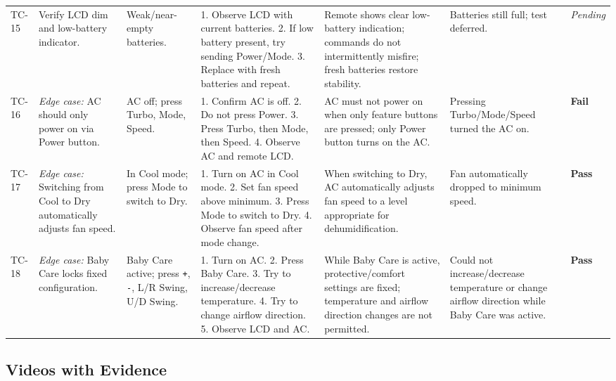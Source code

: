 \documentclass[12pt, a4paper]{article}
\newcommand{\vpass}{\textcolor{PassGreen}{\textbf{Pass}}}
\newcommand{\vfail}{\textcolor{FailRed}{\textbf{Fail}}}
\newcommand{\vpending}{\textcolor{PendingGray}{\textit{Pending}}}
\begin{document}
{\begin{longtable}{@{} C{1cm} L{2.5cm} L{1.8cm} L{3cm} L{2.8cm} L{1.8cm} C{1cm} @{}}
TC-15 & Verify LCD dim and low-battery indicator. & Weak/near-empty batteries. & 1. Observe LCD with current batteries. 2. If low battery present, try sending Power/Mode. 3. Replace with fresh batteries and repeat. & Remote shows clear low-battery indication; commands do not intermittently misfire; fresh batteries restore stability. & Batteries still full; test deferred. & \vpending \\
TC-16 & \textit{Edge case:} AC should only power on via Power button. & AC off; press Turbo, Mode, Speed. & 1. Confirm AC is off. 2. Do not press Power. 3. Press Turbo, then Mode, then Speed. 4. Observe AC and remote LCD. & AC must not power on when only feature buttons are pressed; only Power button turns on the AC. & Pressing Turbo/Mode/Speed turned the AC on. & \vfail \\
TC-17 & \textit{Edge case:} Switching from Cool to Dry automatically adjusts fan speed. & In Cool mode; press Mode to switch to Dry. & 1. Turn on AC in Cool mode. 2. Set fan speed above minimum. 3. Press Mode to switch to Dry. 4. Observe fan speed after mode change. & When switching to Dry, AC automatically adjusts fan speed to a level appropriate for dehumidification. & Fan automatically dropped to minimum speed. & \vpass \\
TC-18 & \textit{Edge case:} Baby Care locks fixed configuration. & Baby Care active; press \texttt{+}, \texttt{-}, L/R Swing, U/D Swing. & 1. Turn on AC. 2. Press Baby Care. 3. Try to increase/decrease temperature. 4. Try to change airflow direction. 5. Observe LCD and AC. & While Baby Care is active, protective/comfort settings are fixed; temperature and airflow direction changes are not permitted. & Could not increase/decrease temperature or change airflow direction while Baby Care was active. & \vpass \\
\bottomrule
\end{longtable}
}

\subsection{Videos with Evidence}
\end{document}
